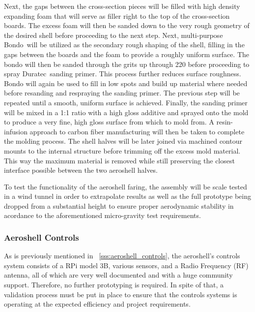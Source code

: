 \indent\indent Next, the gaps between the cross-section pieces will be filled with high density expanding foam that will serve as filler right to the top of the cross-section boards. The excess foam will then be sanded down to the very rough geometry of the desired shell before proceeding to the next step. Next, multi-purpose Bondo\texttrademark\ will be utilized as the secondary rough shaping of the shell, filling in the gaps between the boards and the foam to provide a roughly uniform surface. The bondo will then be sanded through the grits up through 220 before proceeding to spray Duratec\texttrademark\ sanding primer. This process further reduces surface roughness. Bondo will again be used to fill in low spots and build up material where needed before resanding and respraying the sanding primer. The previous step will be repeated until a smooth, uniform surface is achieved. Finally, the sanding primer will be mixed in a 1:1 ratio with a high gloss additive and sprayed onto the mold to produce a very fine, high gloss surface from which to mold from. A resin-infusion approach to carbon fiber manufacturing will then be taken to complete the molding process. The shell halves will be later joined via machined contour mounts to the internal structure before trimming off the excess mold material. This way the maximum material is removed while still preserving the closest interface possible between the two aeroshell halves. 

\indent\indent To test the functionality of the aeroshell faring, the assembly will be scale tested in a wind tunnel in order to extrapolate results as well as the full prototype being dropped from a substantial height to ensure proper aerodynamic stability in acordance to the aforementioned micro-gravity test requirements. 


\subsubsection{\label{sss:aeroshell_controls_validation}Aeroshell Controls}

\indent\indent As is previously mentioned in ~\ref{sss:aeroshell_controls}, the aeroshell's controls system consists of a RPi model 3B, various sensors, and a Radio Frequency (RF) antenna, all of which are very well documented and with a huge community support. Therefore, no further prototyping is required. In spite of that, a validation process must be put in place to ensure that the controls systems is operating at the expected efficiency and project requirements.

